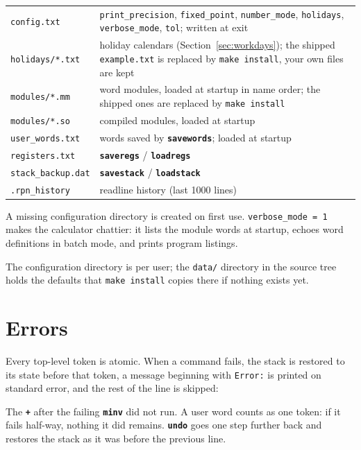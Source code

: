 \documentclass[11pt,letterpaper]{article}
\newcommand{\code}[1]{\texttt{#1}}
\newcommand{\cmd}[1]{\texttt{\textbf{#1}}}
\begin{document}
\begin{center}
\begin{tabular}{@{}lp{}@{}}
\toprule
\code{config.txt} & \code{print\_precision}, \code{fixed\_point}, \code{number\_mode}, \code{holidays}, \code{verbose\_mode}, \code{tol}; written at exit \\
\code{holidays/*.txt} & holiday calendars (Section~\ref{sec:workdays}); the shipped \code{example.txt} is replaced by \code{make install}, your own files are kept \\
\code{modules/*.mm} & word modules, loaded at startup in name order; the shipped ones are replaced by \code{make install} \\
\code{modules/*.so} & compiled modules, loaded at startup \\
\code{user\_words.txt} & words saved by \cmd{savewords}; loaded at startup \\
\code{registers.txt} & \cmd{saveregs} / \cmd{loadregs} \\
\code{stack\_backup.dat} & \cmd{savestack} / \cmd{loadstack} \\
\code{.rpn\_history} & readline history (last 1000 lines) \\
\bottomrule
\end{tabular}
\end{center}
A missing configuration directory is created on first use. \code{verbose\_mode = 1} makes the calculator chattier: it lists the module words at startup, echoes word definitions in batch mode, and prints program listings.

The configuration directory is per user; the \code{data/} directory in the source tree holds the defaults that \code{make install} copies there if nothing exists yet.

\section{Errors}

Every top-level token is atomic. When a command fails, the stack is restored to its state before that token, a message beginning with \code{Error:} is printed on standard error, and the rest of the line is skipped:
The \cmd{+} after the failing \cmd{minv} did not run. A user word counts as one token: if it fails half-way, nothing it did remains. \cmd{undo} goes one step further back and restores the stack as it was before the previous line.
\end{document}
